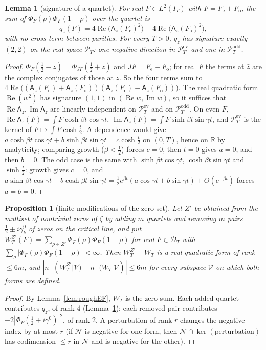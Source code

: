 \documentclass[11pt]{amsart}
\newtheorem{proposition}[theorem]{Proposition}
\newtheorem{lemma}[theorem]{Lemma}
\theoremstyle{definition}
\theoremstyle{remark}
\newcommand{\R}{\mathbb R}
\newcommand{\Rel}{\operatorname{Re}}
\newcommand{\Iml}{\operatorname{Im}}
\newcommand{\PT}{\mathcal P_T}
\newcommand{\IT}{I_T}
\begin{document}
\begin{lemma}[signature of a quartet]\label{thm:inertia-quartet}
For real $F\in L^2(\IT)$ with $F=F_{\mathrm e}+F_{\mathrm o}$, the sum of $\Phi_F(\rho)\Phi_F(1-\rho)$ over the quartet is
\[
q_z(F)=4\Rel\big(\mathsf A_z(F_{\mathrm e})^2\big)-4\Rel\big(\mathsf A_z(F_{\mathrm o})^2\big),
\]
with no cross term between parities. For every $T>0$, $q_z$ has signature exactly $(2,2)$ on the real space $\PT$:
one negative direction in $\PT^{\mathrm{ev}}$ and one in $\PT^{\mathrm{odd}}$.
\end{lemma}
\begin{proof}
$\Phi_F(\frac12-z)=\Phi_{JF}(\frac12+z)$ and $JF=F_{\mathrm e}-F_{\mathrm o}$; for real $F$ the terms at $\bar z$ are the complex
conjugates of those at $z$. So the four terms sum to
$4\Rel\big((\mathsf A_z(F_{\mathrm e})+\mathsf A_z(F_{\mathrm o}))(\mathsf A_z(F_{\mathrm e})-\mathsf A_z(F_{\mathrm o}))\big)$. The real
quadratic form $\Rel(w^2)$ has signature $(1,1)$ in $(\Rel w,\Iml w)$, so it suffices that $\Rel\mathsf A_z,\Iml\mathsf A_z$ are
linearly independent on $\PT^{\mathrm{ev}}$ and on $\PT^{\mathrm{odd}}$. On even $F$, $\Rel\mathsf A_z(F)=\int F\cosh\beta t\cos\gamma t$,
$\Iml\mathsf A_z(F)=\int F\sinh\beta t\sin\gamma t$, and $\PT^{\mathrm{ev}}$ is the kernel of $F\mapsto\int F\cosh\frac t2$. A
dependence would give $a\cosh\beta t\cos\gamma t+b\sinh\beta t\sin\gamma t=c\cosh\frac t2$ on $(0,T)$, hence on $\R$ by
analyticity; comparing growth ($\beta<\frac12$) forces $c=0$, then $t=0$ gives $a=0$, and then $b=0$. The odd case
is the same with $\sinh\beta t\cos\gamma t$, $\cosh\beta t\sin\gamma t$ and $\sinh\frac t2$: growth gives $c=0$, and
$a\sinh\beta t\cos\gamma t+b\cosh\beta t\sin\gamma t=\frac12e^{\beta t}(a\cos\gamma t+b\sin\gamma t)+O(e^{-\beta t})$ forces $a=b=0$.
\end{proof}

\begin{proposition}[finite modifications of the zero set]\label{thm:inertia-rank}
Let $Z'$ be obtained from the multiset of nontrivial zeros of $\zeta$ by adding $m$ quartets and removing $m$ pairs
$\frac12\pm i\gamma^0_k$ of zeros on the critical line, and put $W^{Z'}_T(F)=\sum_{\rho\in Z'}\Phi_F(\rho)\Phi_F(1-\rho)$ for
real $F\in\mathcal D_T$ with $\sum_\rho|\Phi_F(\rho)\Phi_F(1-\rho)|<\infty$. Then $W^{Z'}_T-W_T$ is a real quadratic form of rank
$\le6m$, and $|n_-(W^{Z'}_T|\mathcal V)-n_-(W_T|\mathcal V)|\le6m$ for every subspace $\mathcal V$ on which both forms are defined.
\end{proposition}
\begin{proof}
By Lemma~\ref{lem:roughEF}, $W_T$ is the zero sum. Each added quartet contributes $q_z$, of rank $4$
(Lemma~\ref{thm:inertia-quartet}); each removed pair contributes $-2|\Phi_F(\frac12+i\gamma^0)|^2$, of rank $2$. A
perturbation of rank $r$ changes the negative index by at most $r$ (if $\mathcal N$ is negative for one form, then
$\mathcal N\cap\ker(\text{perturbation})$ has codimension $\le r$ in $\mathcal N$ and is negative for the other).
\end{proof}
\end{document}
